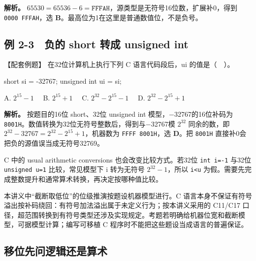 \textbf{解析。} \(65530=65536-6=\mathtt{FFFAH}\)，源类型是无符号16位数，扩展补0，得到 \texttt{0000 FFFAH}，选 \textbf{B}。最高位为1在这里是普通数值位，不是负号。

\subsection{例 2-3　负的 short 转成 unsigned int}\label{CO02-07}

\begin{example}[配套例题]

【配套例题】 在32位计算机上执行下列 C 语言代码段后，ui 的值是（　）。

\par\medskip\noindent\begin{minipage}{\linewidth}
\begin{codeblock}[language=C]
short si = -32767;
unsigned int ui = si;
\end{codeblock}
\end{minipage}\par\medskip

A. \(2^{15}-1\)　 B. \(2^{15}+1\)　 C. \(2^{32}-2^{15}-1\)　 D. \(2^{32}-2^{15}+1\)

\end{example}

\textbf{解析。} 按题目的16位 short、32位 unsigned int 模型，\ensuremath{-}32767的16位补码为 \texttt{8001H}。数值转换为32位无符号整数后，得到与\ensuremath{-}32767模 \(2^{32}\) 同余的数，即 \(2^{32}-32767=2^{32}-2^{15}+1\)，机器数为 \texttt{FFFF 8001H}，选 \textbf{D}。把 \texttt{8001H} 直接补0会把负的源值误当成无符号32769。

C 中的 usual arithmetic conversions 也会改变比较方式。若32位 \texttt{int i=\allowbreak{}-1} 与32位 \texttt{unsigned u=\allowbreak{}1} 比较，常见模型下 i 转为无符号 \(2^{32}-1\)，所以 \texttt{i<\allowbreak{}u} 为假。需要先完成整数提升和通常算术转换，再决定按哪种值比较。

本讲义中``截断取低位''的位级推演按题设机器模型进行。C 语言本身不保证有符号溢出按补码绕回：有符号加法溢出属于未定义行为；按本讲义采用的 C11/C17 口径，超范围转换到有符号类型还涉及实现规定。考题若明确给机器位宽和截断模型，可据模型计算；编写可移植 C 程序时不能把这些题设当成语言的普遍保证。

\subsection{移位先问逻辑还是算术}\label{CO02-08}

